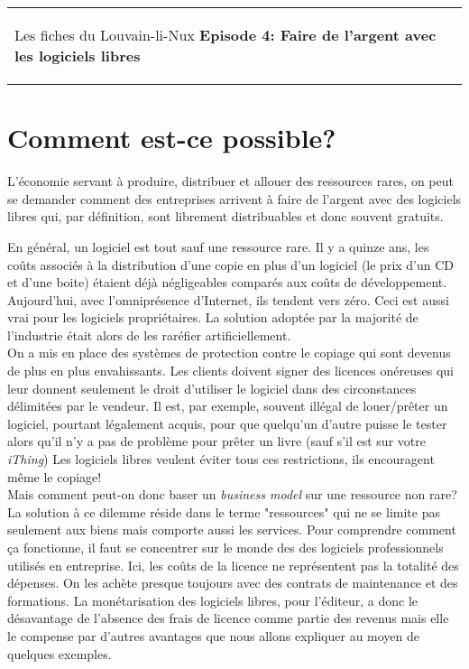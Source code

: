



\begin{tabular}{p{14cm}r}
    \begin{center}{\Large Les fiches du Louvain-li-Nux\linebreak \linebreak
    \LARGE \textbf{Episode 4: Faire de l'argent avec les logiciels libres}}\end{center}
		&
	\usebox{\logollnux}
\end{tabular}


\section*{Comment est-ce possible?}
L'économie servant à produire, distribuer et allouer des ressources rares,
on peut se demander comment des entreprises arrivent à faire de l'argent avec des logiciels libres qui, par définition, sont librement distribuables et donc souvent gratuits.

En général, un logiciel est tout sauf une ressource rare. Il y a quinze ans, les coûts
associés à la distribution d'une copie en plus d'un logiciel (le prix d'un CD et d'une boite) étaient déjà négligeables
comparés aux coûts de développement. Aujourd’hui, avec l'omniprésence d'Internet, ils tendent vers zéro.
Ceci est aussi vrai pour les logiciels propriétaires. La solution adoptée par
la majorité de l'industrie était alors de les raréfier artificiellement.\\
On a mis en place des systèmes de protection contre le copiage qui sont devenus 
de plus en plus envahissants. Les clients doivent signer des licences onéreuses qui
leur donnent seulement le droit d'utiliser le logiciel dans des circonstances délimitées par le vendeur.
Il est, par exemple, souvent illégal de louer/prêter un logiciel, pourtant légalement acquis,
pour que quelqu'un d'autre puisse le tester alors qu'il n'y a pas de problème pour prêter un livre (sauf s'il est sur votre \textit{iThing})
Les logiciels libres veulent éviter tous ces restrictions, ils encouragent même le copiage!\\

Mais comment peut-on donc baser un \textit{business model} sur une ressource non rare?                           
La solution à ce dilemme réside dans le terme "ressources" qui
ne se limite pas seulement aux biens mais comporte aussi les services.
Pour comprendre comment ça fonctionne, il faut se concentrer sur le monde des 
des logiciels professionnels utilisés en entreprise. Ici, les coûts de la licence
ne représentent pas la totalité des dépenses. On les achète presque toujours avec
des contrats de maintenance et des formations.
La monétarisation des logiciels libres, pour l'éditeur, a donc le désavantage de l'absence des frais de licence
comme partie des revenus mais elle le compense par d'autres avantages que nous allons 
expliquer au moyen de quelques exemples.

